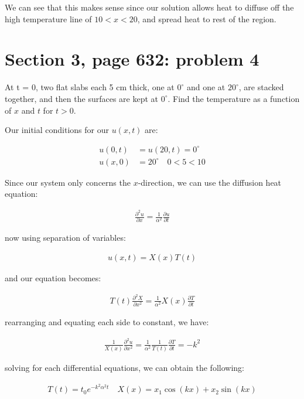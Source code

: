 \documentclass{article}
\numberwithin{equation}{section}
\begin{document}
We can see that this makes sense since our solution allows heat to diffuse off the high temperature line of $10<x<20$, and spread heat to rest of the region.

\section{Section 3, page 632: problem 4}

At t = 0, two flat slabs each 5 cm thick, one at $0^\circ$ and one at $20^\circ$, are stacked together, and then the surfaces are kept at $0^\circ$. Find the temperature as a function of $x$ and $t$ for $t > 0$.

Our initial conditions for our $u(x,t)$ are:

\begin{align}
    u(0, t) &= u(20, t) = 0^\circ \\
    u(x, 0) &= 20^\circ \quad 0 < 5 < 10
\end{align}

Since our system only concerns the $x$-direction, we can use the diffusion heat equation:

\begin{align}
    \frac{\partial^2 u}{\partial x} = \frac{1}{\alpha^2} \frac{\partial u}{\partial t}
\end{align}

now using separation of variables:

\begin{align}
    u(x,t) = X(x)T(t)
\end{align}

and our equation becomes:

\begin{align}
    T(t) \frac{\partial^2 X}{\partial x^2} = \frac{1}{\alpha^2} X(x) \frac{\partial T}{\partial t} 
\end{align}

rearranging and equating each side to constant, we have:

\begin{align}
    \frac{1}{X(x)} \frac{\partial^2 u}{\partial x^2} = \frac{1}{\alpha^2} \frac{1}{T(t)} \frac{\partial T}{\partial t} = -k^2
\end{align}

solving for each differential equations, we can obtain the following: 

\begin{align}
    T(t) = t_0 e^{-k^2 \alpha^2 t} \quad X(x) = x_1 \cos(kx) + x_2 \sin(kx)
\end{align}
\end{document}
